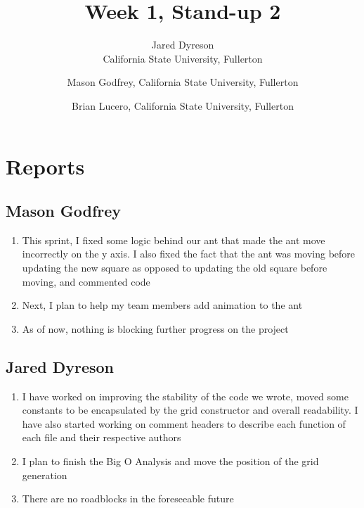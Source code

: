 \documentclass{article}
\title{Week 1, Stand-up 2}
\author{Jared Dyreson\\ California State University, Fullerton 
\and Mason Godfrey, California State University, Fullerton
\and Brian Lucero, California State University, Fullerton}
\begin{document}
\maketitle
\tableofcontents
\newpage

\section{Reports}

\subsection{Mason Godfrey}
\begin{enumerate}
\item This sprint, I fixed some logic behind our ant that made the ant move incorrectly on the y axis. I also fixed the fact that the ant was moving before updating the new square as opposed to updating the old square before moving, and commented code
\item Next, I plan to help my team members add animation to the ant
\item As of now, nothing is blocking further progress on the project
\end{enumerate}

\subsection{Jared Dyreson}
\begin{enumerate}
\item I have worked on improving the stability of the code we wrote, moved some constants to be encapsulated by the grid constructor and overall readability. I have also started working on comment headers to describe each function of each file and their respective authors
\item I plan to finish the Big O Analysis and move the position of the grid generation
\item There are no roadblocks in the foreseeable future
\end{enumerate}
\end{document}
